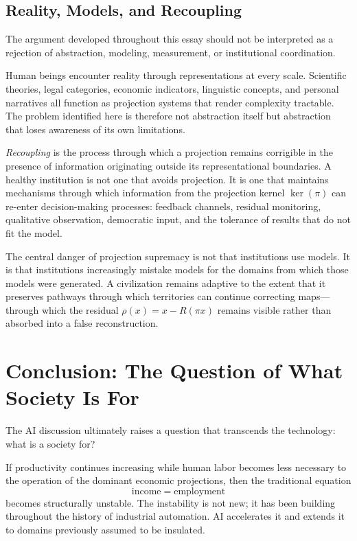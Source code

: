\documentclass[12pt, a4paper]{article}
\theoremstyle{plain}
\theoremstyle{definition}
\theoremstyle{remark}
\begin{document}
\subsection*{Reality, Models, and Recoupling}

The argument developed throughout this essay should not be interpreted as a
rejection of abstraction, modeling, measurement, or institutional coordination.

Human beings encounter reality through representations at every scale.
Scientific theories, legal categories, economic indicators, linguistic concepts,
and personal narratives all function as projection systems that render complexity
tractable.
The problem identified here is therefore not abstraction itself but abstraction
that loses awareness of its own limitations.

\emph{Recoupling} is the process through which a projection remains corrigible
in the presence of information originating outside its representational boundaries.
A healthy institution is not one that avoids projection.
It is one that maintains mechanisms through which information from the projection
kernel $\ker(\pi)$ can re-enter decision-making processes: feedback channels,
residual monitoring, qualitative observation, democratic input, and the tolerance
of results that do not fit the model.

The central danger of projection supremacy is not that institutions use models.
It is that institutions increasingly mistake models for the domains from which
those models were generated.
A civilization remains adaptive to the extent that it preserves pathways through
which territories can continue correcting maps---through which the residual
$\rho(x) = x - R(\pi x)$ remains visible rather than absorbed into a false
reconstruction.

\section{Conclusion: The Question of What Society Is For}

The AI discussion ultimately raises a question that transcends the technology:
what is a society for?

If productivity continues increasing while human labor becomes less necessary
to the operation of the dominant economic projections, then the traditional equation
\[
\text{income} \;=\; \text{employment}
\]
becomes structurally unstable.
The instability is not new; it has been building throughout the history of industrial
automation.
AI accelerates it and extends it to domains previously assumed to be insulated.
\end{document}
